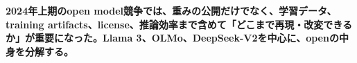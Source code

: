 \noindent\textbf{2024年上期のopen model競争では、重みの公開だけでなく、学習データ、training artifacts、license、推論効率まで含めて「どこまで再現・改変できるか」が重要になった。Llama 3、OLMo、DeepSeek-V2を中心に、openの中身を分解する。}\autocite{src-3d2fa83e273d,src-d9d69089eb6a,src-f9616f30e8f5}
